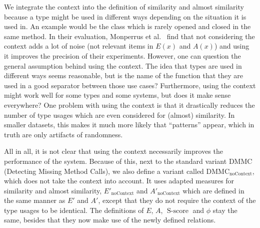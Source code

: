 We integrate the context into the definition of similarity and almost similarity because a type might be used in different ways depending on the situation it is used in.
An example would be the class  which is rarely opened and closed in the same method.
In their evaluation, Monperrus et al.~\cite{monperrus2013detecting} find that not considering the context adds a lot of noise (not relevant items in $E(x)$ and $A(x)$) and using it improves the precision of their experiments.
However, one can question the general assumption behind using the context.
The idea that types are used in different ways seems reasonable, but is the name of the function that they are used in a good separator between those use cases?
Furthermore, using the context might work well for some types and some systems, but does it make sense everywhere?
One problem with using the context is that it drastically reduces the number of type usages which are even considered for (almost) similarity.
In smaller datasets, this makes it much more likely that ``patterns'' appear, which in truth are only artifacts of randomness.

All in all, it is not clear that using the context necessarily improves the performance of the system.
Because of this, next to the standard variant $\text{DMMC}$ (Detecting Missing Method Calls), we also define a variant called $\text{DMMC}_{\text{noContext}}$, which does not take the context into account.
It uses adapted measures for similarity and almost similarity, $E'_{\text{noContext}}$ and $A'_{\text{noContext}}$ which are defined in the same manner as $E'$ and $A'$, except that they do not require the context of the type usages to be identical.
The definitions of $E$, $A$, $\operatorname{S-score}$ and $\phi$ stay the same, besides that they now make use of the newly defined relations.


